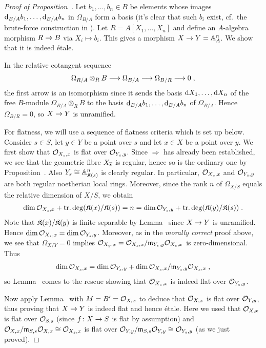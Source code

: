 \documentclass[a4paper,parskip=half,numbers=enddot, DIV=12]{scrreprt}
\begin{document}
\begin{proof}[Proof of Proposition~]
	Let $b_1,\ldots,b_n\in B$ be elements whose images $\mathop{}\!\mathrm{d}_{B/A}b_1,\ldots,\mathop{}\!\mathrm{d}_{B/A}b_n$ in $\Omega_{B/A}$ form a basis (it's clear that such $b_i$ exist, cf.\ the brute-force construction in \cite[Proposition~1.4.1]{alg2}). Let $R=A[X_1,\ldots,X_n]$ and define an $A$-algebra morphism $R\morphism B$ via $X_i\mapsto b_i$. This gives a morphism $X\morphism Y=\IA_A^n$. We show that it is indeed étale. 
	
	In the relative cotangent sequence
	\begin{align*}
		\Omega_{R/A}\otimes_RB\morphism \Omega_{B/A}\morphism \Omega_{B/R}\morphism 0\;,
	\end{align*}
	the first arrow is an isomorphism since it sends the basis $\mathop{}\!\mathrm{d} X_1,\ldots,\mathop{}\!\mathrm{d} X_n$ of the free $B$-module $\Omega_{R/A}\otimes_RB$ to the basis $\mathop{}\!\mathrm{d}_{B/A}b_1,\ldots,\mathop{}\!\mathrm{d}_{B/A}b_n$ of $\Omega_{B/A}$. Hence $\Omega_{B/R}=0$, so $X\morphism Y$ is unramified.
	
	For flatness, we will use a sequence of flatness criteria which is set up below. Consider $s\in S$, let $y\in Y$ be a point over $s$ and let $x\in X$ be a point over $y$. We first show that $\mathcal{O}_{X_s,x}$ is flat over $\mathcal{O}_{Y_s,y}$. Since  $\Rightarrow$  has already been established, we see that the geometric fibre $X_{\overline{s}}$ is regular, hence so is the ordinary one by Proposition~. Also $Y_s\cong \mathbb{A}_{\mathfrak{K}(s)}^n$ is clearly regular. In particular, $\mathcal{O}_{X_s,x}$ and $\mathcal{O}_{Y_s,y}$ are both regular noetherian local rings. Moreover, since the rank $n$ of $\Omega_{X/S}$ equals the relative dimension of $X/S$, we obtain
	\begin{align*}
		\dim\mathcal{O}_{X_s,x}+\operatorname{tr.deg}(\mathfrak{K}(x)/\mathfrak{K}(s))=n=\dim\mathcal{O}_{Y_s,y}+\operatorname{tr.deg}(\mathfrak{K}(y)/\mathfrak{K}(s))\;.
	\end{align*}
	Note that $\mathfrak{K}(x)/\mathfrak{K}(y)$ is finite separable by Lemma~ since $X\morphism Y$ is unramified. Hence $\dim\mathcal{O}_{X_s,x}=\dim\mathcal{O}_{Y_s,y}$. Moreover, as in the \emph{morally correct} proof above, we see that $\Omega_{X/Y}=0$ implies $\mathcal{O}_{X_y,x}=\mathcal{O}_{X_s,x}/\mathfrak{m}_{Y_s,y}\mathcal{O}_{X_s,x}$ is zero-dimensional. Thus
	\begin{align*}
		\dim\mathcal{O}_{X_s,x}=\dim\mathcal{O}_{Y_s,y}+\dim\mathcal{O}_{X_s,x}/\mathfrak{m}_{Y_s,y}\mathcal{O}_{X_s,x}\;,
	\end{align*}
	so Lemma~ comes to the rescue showing that $\mathcal{O}_{X_s,x}$ is indeed flat over $\mathcal{O}_{Y_s,y}$.
	
	Now apply Lemma~ with $M=B'=\mathcal{O}_{X,x}$ to deduce that $\mathcal{O}_{X,x}$ is flat over $\mathcal{O}_{Y,y}$, thus proving that $X\morphism Y$ is indeed flat and hence étale.  Here we used that $\mathcal{O}_{X,x}$ is flat over $\mathcal{O}_{S,s}$ (since $f\colon X\morphism S$ is flat by assumption) and $\mathcal{O}_{X,x}/\mathfrak{m}_{S,s}\mathcal{O}_{X,x}\cong \mathcal{O}_{X_s,x}$ is flat over $\mathcal{O}_{Y,y}/\mathfrak{m}_{S,s}\mathcal{O}_{Y,y}\cong \mathcal{O}_{Y_s,y}$ (as we just proved).
	

\end{proof}
\end{document}
